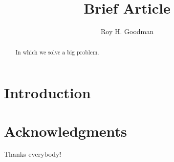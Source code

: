 \documentclass[11pt]{amsart}
\title{Brief Article}
\author{Roy H. Goodman}
\date{}                                           %
\numberwithin{equation}{section}
\numberwithin{figure}{section}
\begin{document}
\begin{abstract}
In which we solve a big problem.
\end{abstract}


\maketitle


\section{Introduction}



\section*{Acknowledgments}
Thanks everybody!


%
\end{document}
